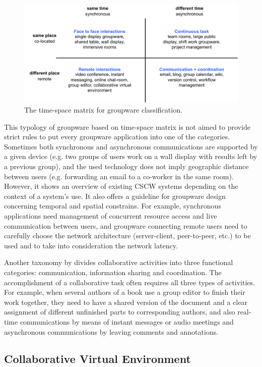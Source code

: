 \begin{figure}[htb]
  \centering
  \includegraphics[width=\textwidth]{figures/ch1/tsmatrix}
  \caption{\label{fig:1_tsmatrix}The time-space matrix for groupware classification.}
\end{figure}

This typology of groupware based on time-space matrix is not aimed to provide strict rules to put every groupware application into one of the categories. Sometimes both synchronous and asynchronous communications are supported by a given device (e.g. two groups of users work on a wall display with results left by a previous group), and the used technology does not imply geographic distance between users (e.g. forwarding an email to a co-worker in the same room). However, it shows an overview of existing CSCW systems depending on the context of a system's use. It also offers a guideline for groupware design concerning temporal and spatial constrains. For example, synchronous applications need management of concurrent resource access and live communication between users, and groupware connecting remote users need to carefully choose the network architecture (server-client, peer-to-peer, etc.) to be used and to take into consideration the network latency.

Another taxonomy by \citep{Grudin2012Taxonomy} divides collaborative activities into three functional categories: communication, information sharing and coordination. The accomplishment of a collaborative task often requires all three types of activities. For example, when several authors of a book use a group editor to finish their work together, they need to have a shared version of the document and a clear assignment of different unfinished parts to corresponding authors, and also real-time communications by means of instant messages or audio meetings and asynchronous communications by leaving comments and annotations.


\subsection{Collaborative Virtual Environment}
